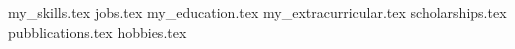 \documentclass[11pt, a4paper]{awesome-cv}
\newcommand*{\sectiondir}{cv/}
\begin{document}
\makecvheader

{my_skills.tex}
{jobs.tex}
{my_education.tex}
{my_extracurricular.tex}
{scholarships.tex}
{pubblications.tex}
{hobbies.tex}
\end{document}
